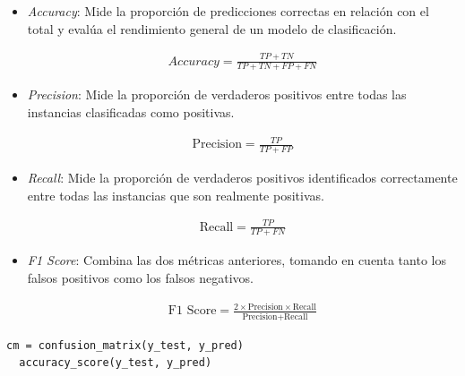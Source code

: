 \begin{itemize}
  \item \textit{Accuracy}: Mide la proporción de predicciones correctas en relación con el total y evalúa el rendimiento general de un modelo de clasificación.
  
  \begin{equation}
    \begin{aligned}
      \textit{Accuracy} = \frac{{TP + TN}}{{TP + TN + FP + FN}}
    \end{aligned}
  \end{equation}

\pagebreak 

  \item \textit{Precision}: Mide la proporción de verdaderos positivos entre todas las instancias clasificadas como positivas.
  
  \begin{equation}
    \begin{aligned}
      \text{Precision} = \frac{{TP}}{{TP + FP}}
    \end{aligned}
  \end{equation}

  \item \textit{Recall}: Mide la proporción de verdaderos positivos identificados correctamente entre todas las instancias que son realmente positivas. 
  
  \begin{equation}
    \begin{aligned}
      \text{Recall} = \frac{{TP}}{{TP + FN}}
    \end{aligned}
  \end{equation}

  \item \textit{F1 Score}: Combina las dos métricas anteriores, tomando en cuenta tanto los falsos positivos como los falsos negativos.
  
  \begin{equation}
    \begin{aligned}
      \text{F1 Score} = \frac{{2 \times \text{Precision} \times \text{Recall}}}{{\text{Precision} + \text{Recall}}}
    \end{aligned}
  \end{equation}
  
\end{itemize}

\begin{lstlisting}[style=Python, caption={Implementación de la matriz de confusión}]
  cm = confusion_matrix(y_test, y_pred)
  accuracy_score(y_test, y_pred)
\end{lstlisting}

